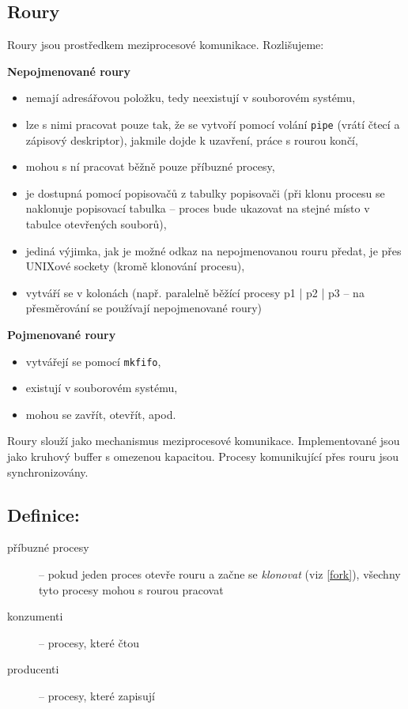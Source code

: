\documentclass[a4paper, 11pt]{article}
\newcommand{\tcmd}[1]{\texttt{#1}}
\begin{document}
\newpage

\subsection{Roury}
Roury jsou prostředkem meziprocesové komunikace. Rozlišujeme:
 
\textbf{Nepojmenované roury}
\begin{itemize}
    \item nemají adresářovou položku, tedy neexistují v souborovém systému,
    \item lze s nimi pracovat pouze tak, že se vytvoří pomocí volání \tcmd{pipe} (vrátí čtecí a zápisový deskriptor), jakmile dojde k uzavření, práce s rourou končí,
    \item mohou s ní pracovat běžně pouze příbuzné procesy,
    \item je dostupná pomocí popisovačů z tabulky popisovači (při klonu procesu se naklonuje popisovací tabulka -- proces bude ukazovat na stejné místo v tabulce otevřených souborů),
    \item jediná výjimka, jak je možné odkaz na nepojmenovanou rouru předat, je přes UNIXové sockety (kromě klonování procesu),
    \item vytváří se v kolonách (např. paralelně běžící procesy p1 | p2 | p3 -- na přesměrování se používají nepojmenované roury)
\end{itemize}
 
\textbf{Pojmenované roury}
\begin{itemize}
    \item vytvářejí se pomocí \tcmd{mkfifo},
    \item existují v souborovém systému,
    \item mohou se zavřít, otevřít, apod.
\end{itemize}
 
Roury slouží jako mechanismus meziprocesové komunikace. Implementované jsou jako kruhový buffer s omezenou kapacitou. Procesy komunikující přes rouru jsou synchronizovány.
 
\subsection*{Definice:}
\begin{description}
\item[příbuzné procesy] -- pokud jeden proces otevře rouru a začne se \textit{klonovat} (viz \ref{fork}), všechny tyto procesy mohou s rourou pracovat

\item[konzumenti] -- procesy, které čtou

\item[producenti] -- procesy, které zapisují
\end{description}
\end{document}
